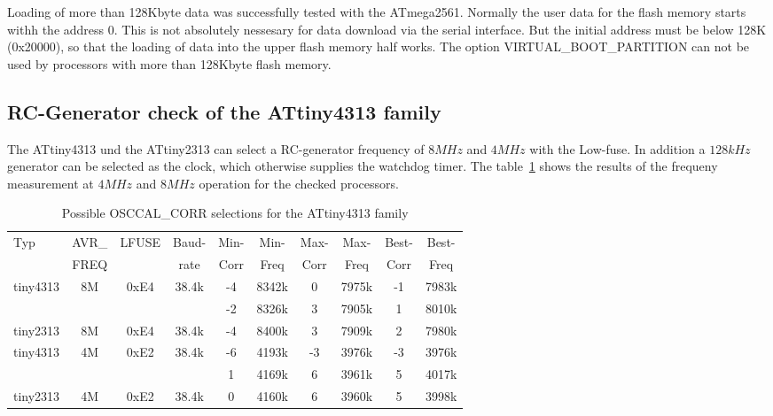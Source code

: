 Loading of more than 128Kbyte data was successfully tested with the ATmega2561.
Normally the user data for the flash memory starts withh the address 0.
This is not absolutely nessesary for data download via the serial interface.
But the initial address must be below 128K (0x20000), so that the loading
of data into the upper flash memory half works.
The option VIRTUAL\_BOOT\_PARTITION can not be used by processors with
more than 128Kbyte flash memory.

\subsection{RC-Generator check of the ATtiny4313 family}

The ATtiny4313 und the ATtiny2313 can select a RC-generator frequency of
\(8MHz\) and \(4MHz\) with the Low-fuse.
In addition a \(128kHz\) generator can be selected as the clock, which
otherwise supplies the watchdog timer.
The table~\ref{tab:tiny4313freq} shows the results of the frequeny measurement
at \(4MHz\) and \(8MHz\) operation for the checked processors.

\begin{table}[H]
  \begin{center}
    \begin{tabular}{| l | c | c | c || c | c || c | c || c | c |}
    \hline
   Typ  &       AVR\_ & LFUSE & Baud- & Min- & Min- & Max- & Max- & Best- & Best-  \\
        &       FREQ  &       & rate & Corr & Freq & Corr & Freq  & Corr  & Freq  \\
    \hline
    \hline
tiny4313 &         8M & 0xE4  & 38.4k &  -4  & 8342k & 0  & 7975k  & -1  & 7983k \\
         &            &       &       &  -2  & 8326k & 3  & 7905k  & 1  & 8010k \\
    \hline
tiny2313 &         8M & 0xE4  & 38.4k &  -4  & 8400k & 3  & 7909k  &  2  & 7980k \\
    \hline
tiny4313 &         4M & 0xE2  & 38.4k &  -6  & 4193k & -3  & 3976k  & -3  & 3976k \\
         &            &       &       &   1  & 4169k & 6  & 3961k  & 5  & 4017k \\
    \hline
tiny2313 &         4M & 0xE2  & 38.4k &   0  & 4160k & 6  & 3960k  &  5  & 3998k \\
    \hline
    \end{tabular}
  \end{center}
  \caption{Possible OSCCAL\_CORR selections for the ATtiny4313 family}
  \label{tab:tiny4313freq}
\end{table}

